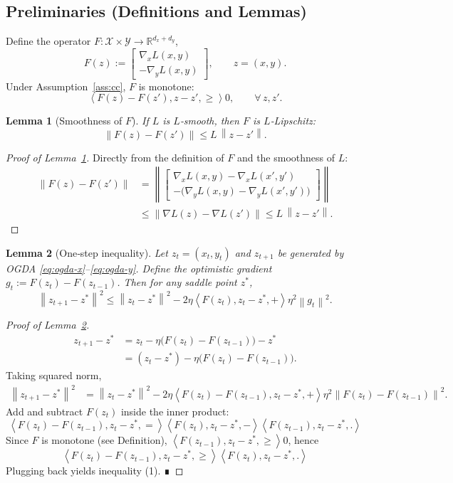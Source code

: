 \documentclass{article}
\newtheorem{lemma}{Lemma}
\newcommand{\R}{\mathbb{R}}
\newcommand{\norm}[1]{\left\|#1\right\|}
\newcommand{\inner}[2]{\left\langle #1,#2\right\rangle}
\begin{document}
\subsection*{Preliminaries (Definitions and Lemmas)}
\begin{definition}
Define the operator $F:\mathcal{X}\times\mathcal{Y}\to\R^{d_x+d_y}$,
\[
F(z):=
\begin{bmatrix}
\nabla_x L(x,y)\\[1mm]
-\nabla_y L(x,y)
\end{bmatrix},
\qquad z=(x,y).
\]
Under Assumption~\ref{ass:cc}, $F$ is monotone:
\[
\inner{F(z)-F(z'),z-z'}\ge0,\qquad\forall\,z,z'.
\]
\end{definition}
\begin{lemma}[Smoothness of $F$]\label{lem:smoothF}
If $L$ is $L$‑smooth, then $F$ is $L$‑Lipschitz:
\[
\norm{F(z)-F(z')}\le L\,\norm{z-z'}.
\]
\end{lemma}
\begin{proof}[Proof of Lemma~\ref{lem:smoothF}]
Directly from the definition of $F$ and the smoothness of $L$:
\[
\begin{aligned}
\norm{F(z)-F(z')}
&=\norm{\begin{bmatrix}
\nabla_x L(x,y)-\nabla_x L(x',y')\\[1mm]
-\bigl(\nabla_y L(x,y)-\nabla_y L(x',y')\bigr)
\end{bmatrix}}\\
&\le \norm{\nabla L(z)-\nabla L(z')}\le L\,\norm{z-z'}.
\end{aligned}
\] 
\end{proof}
\begin{lemma}[One‑step inequality]\label{lem:one-step}
Let $z_t=(x_t,y_t)$ and $z_{t+1}$ be generated by OGDA \eqref{eq:ogda-x}–\eqref{eq:ogda-y}.  
Define the \emph{optimistic gradient} $g_t:=F(z_t)-F(z_{t-1})$.  
Then for any saddle point $z^*$,
\[
\norm{z_{t+1}-z^*}^{2}
\le \norm{z_{t}-z^*}^{2}
-2\eta\inner{F(z_t),z_t-z^*}
+ \eta^{2}\norm{g_t}^{2}. \tag{1}
\]
\end{lemma}
\begin{proof}[Proof of Lemma~\ref{lem:one-step}]
\begin{align*}
z_{t+1}-z^*
&=z_t -\eta\bigl(F(z_t)-F(z_{t-1})\bigr)-z^*\\
&=(z_t-z^*)-\eta\bigl(F(z_t)-F(z_{t-1})\bigr).
\end{align*}
Taking squared norm,
\[
\begin{aligned}
\norm{z_{t+1}-z^*}^{2}
&=\norm{z_t-z^*}^{2}
-2\eta\inner{F(z_t)-F(z_{t-1}),z_t-z^*}
+\eta^{2}\norm{F(z_t)-F(z_{t-1})}^{2}.
\end{aligned}
\]
Add and subtract $F(z_t)$ inside the inner product:
\[
\inner{F(z_t)-F(z_{t-1}),z_t-z^*}
=\inner{F(z_t),z_t-z^*}-\inner{F(z_{t-1}),z_t-z^*}.
\]
Since $F$ is monotone (see Definition), $\inner{F(z_{t-1}),z_t-z^*}\ge0$,
hence
\[
\inner{F(z_t)-F(z_{t-1}),z_t-z^*}\ge\inner{F(z_t),z_t-z^*}.
\]
Plugging back yields inequality (1).  ∎
\end{proof}
\end{document}

